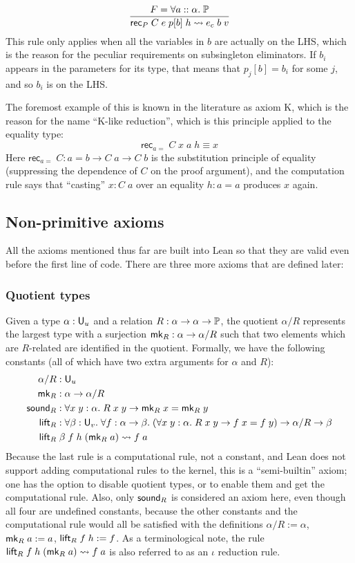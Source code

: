 $$\frac{F=\forall a::\alpha.\;\P}{\rec_P\;C\;e\;p[b]\;h\rightsquigarrow e_c\;b\;v}$$
This rule only applies when all the variables in $b$ are actually on the LHS, which is the reason for the peculiar requirements on subsingleton eliminators. If $b_i$ appears in the parameters for its type, that means that $p_j[b]=b_i$ for some $j$, and so $b_i$ is on the LHS. 

The foremost example of this is known in the literature as axiom K, which is the reason for the name ``K-like reduction'', which is this principle applied to the equality type:
$$\mathsf{rec}_{a=}\;C\;x\;a\;h\equiv x$$
Here $\mathsf{rec}_{a=}\;C:a=b\to C\;a\to C\;b$ is the substitution principle of equality (suppressing the dependence of $C$ on the proof argument), and the computation rule says that ``casting'' $x:C\;a$ over an equality $h:a=a$ produces $x$ again.
%
\subsection{Non-primitive axioms}

All the axioms mentioned thus far are built into Lean so that they are valid even before the first line of code. There are three more axioms that are defined later:

\subsubsection{Quotient types}
Given a type $\alpha:\U_u$ and a relation $R:\alpha\to\alpha\to\P$, the quotient $\alpha/R$ represents the largest type with a surjection $\mk_R:\alpha\to\alpha/R$ such that two elements which are $R$-related are identified in the quotient. Formally, we have the following constants (all of which have two extra arguments for $\alpha$ and $R$):
\begin{align*}
\alpha/R&:\U_u\\
\mk_R&:\alpha\to\alpha/R\\
\sound_R&:\forall x\;y:\alpha.\;R\;x\;y\to \mk_R\;x=\mk_R\;y\\
\lift_R&:\forall\beta:\U_v.\;\forall f:\alpha\to\beta.\;(\forall x\;y:\alpha.\;R\;x\;y\to f\;x=f\;y)\to \alpha/R\to\beta\\
\lift_R&\;\beta\;f\;h\;(\mk_R\;a)\rightsquigarrow f\;a
\end{align*}
Because the last rule is a computational rule, not a constant, and Lean does not support adding computational rules to the kernel, this is a ``semi-builtin'' axiom; one has the option to disable quotient types, or to enable them and get the computational rule. Also, only $\sound_R$ is considered an axiom here, even though all four are undefined constants, because the other constants and the computational rule would all be satisfied with the definitions $\alpha/R:=\alpha$, $\mk_R\;a:=a$, $\lift_R\;f\;h:=f$. As a terminological note, the rule $\lift_R\;f\;h\;(\mk_R\;a)\rightsquigarrow f\;a$ is also referred to as an $\iota$ reduction rule.

